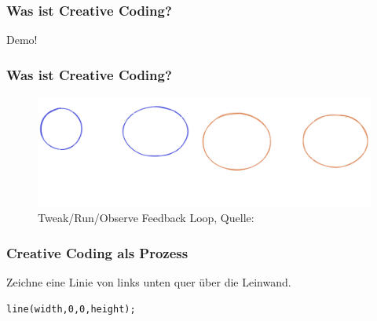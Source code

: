 \documentclass[aspectratio=169]{beamer}
\begin{document}
\begin{frame}
	\frametitle{Was ist Creative Coding?}
    \begin{center}
    \Huge Demo!
    \end{center}
\end{frame}

\begin{frame}
	\frametitle{Was ist Creative Coding?}
    \begin{figure}
    \includegraphics[width=\textwidth]{./figs/cycle.png}
    \caption{Tweak/Run/Observe Feedback Loop, Quelle: \cite{mitchell:2013}}
    \end{figure}
\end{frame}

\begin{frame}[fragile]
\frametitle{Creative Coding als Prozess}
Zeichne eine Linie von links unten quer über die Leinwand.
{\color{p5darkbasicstyle}
\begin{lstlisting}
line(width,0,0,height);
\end{lstlisting}
  }

  \begin{center}
  \end{center}
\end{frame}
\end{document}
